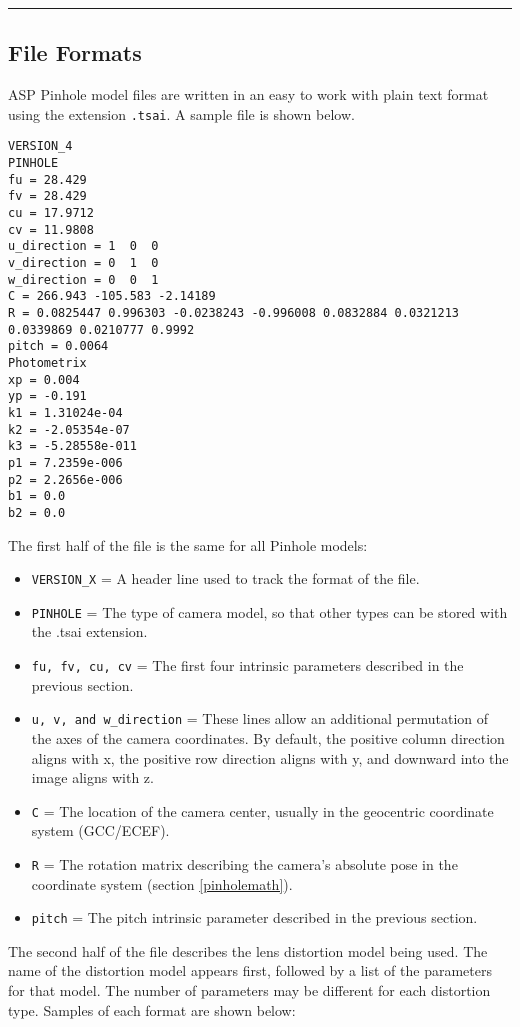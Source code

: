 \hrule
\subsection{File Formats}
\label{file_format}
\bigskip

ASP Pinhole model files are written in an easy to work with plain text format 
using the extension \texttt{.tsai}.
A sample file is shown below. 

\begin{verbatim}
VERSION_4
PINHOLE
fu = 28.429
fv = 28.429
cu = 17.9712
cv = 11.9808
u_direction = 1  0  0
v_direction = 0  1  0
w_direction = 0  0  1
C = 266.943 -105.583 -2.14189
R = 0.0825447 0.996303 -0.0238243 -0.996008 0.0832884 0.0321213 0.0339869 0.0210777 0.9992
pitch = 0.0064
Photometrix
xp = 0.004
yp = -0.191
k1 = 1.31024e-04
k2 = -2.05354e-07
k3 = -5.28558e-011
p1 = 7.2359e-006
p2 = 2.2656e-006
b1 = 0.0
b2 = 0.0
\end{verbatim}

The first half of the file is the same for all Pinhole models:

\begin{itemize}{}
\item  \texttt{VERSION\_X} = A header line used to track the format of the file.
\item  \texttt{PINHOLE} = The type of camera model, so that other types can be stored with the .tsai extension.
\item  \texttt{fu, fv, cu, cv} = The first four intrinsic parameters described in the previous section.
\item  \texttt{u, v, and w\_direction} = These lines allow an additional permutation of the 
axes of the camera coordinates.  By default, the positive column direction aligns with x, the
positive row direction aligns with y, and downward into the image aligns with z.
\item  \texttt{C} = The location of the camera center, usually in the geocentric coordinate system (GCC/ECEF).
\item  \texttt{R} = The rotation matrix describing the camera's absolute pose in the coordinate system (section \ref{pinholemath}).
\item  \texttt{pitch} = The pitch intrinsic parameter described in the previous section.
\end{itemize}

The second half of the file describes the lens distortion model being used.  The name of the
distortion model appears first, followed by a list of the parameters for that model.  The number
of parameters may be different for each distortion type.  Samples of each format are shown below:

